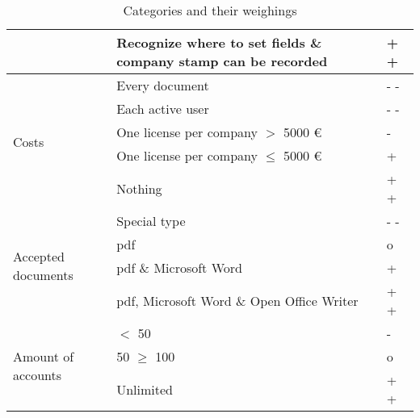 \begin{table}[h!]
\begin{tabular}{|p{4cm}|p{9cm}|p{1.5cm}|}
									& Recognize where to set fields \& company stamp can be recorded & + + \\ \hline
		\multirow{5}{*}{Costs} & Every document & - - \\ \cline{2-3}
								& Each active user & - - \\ \cline{2-3}
								& One license per company $>$ 5000 \euro & - \\ \cline{2-3}
								& One license per company $\leqslant$ 5000 \euro & + \\ \cline{2-3}
								& Nothing & + + \\ \hline
		\multirow{4}{*}{Accepted documents} & Special type & - - \\ \cline{2-3}
											& \Gls{pdf} & o \\ \cline{2-3}
											& \Gls{pdf} \& Microsoft Word & + \\ \cline{2-3}
											& \Gls{pdf}, Microsoft Word \& Open Office Writer & + + \\ \hline
		\multirow{3}{*}{Amount of accounts} & $<$ 50 & - \\ \cline{2-3}
											& 50 $\geq$ 100 & o \\ \cline{2-3}
											& Unlimited & + + \\ \hline

	\end{tabular}
	\caption{Categories and their weighings}
	\label{tab:resTcateg}
\end{table}
\newpage